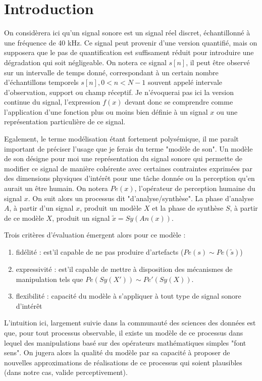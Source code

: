 \section{Introduction}

On considèrera ici qu'un signal sonore est un signal réel discret, échantillonné à une fréquence de 40 kHz. Ce signal peut provenir d'une version quantifié, mais on supposera que le pas de quantification est suffisament réduit pour introduire une dégradation qui soit négligeable. On notera ce signal $s[n]$, il peut être observé sur un intervalle de temps donné, correspondant à un certain nombre d'échantillons temporels $s[n], 0<n<N-1$ souvent appelé intervale d'observation, support ou champ réceptif. Je n'évoquerai pas ici la version continue du signal, l'expression $f(x)$ devant donc se comprendre comme l'application d'une fonction plus ou moins bien définie à un signal $x$ ou une représentation particulière de ce signal.

Egalement, le terme modélisation étant fortement polysémique, il me paraît important de préciser l'usage que je ferais du terme "modèle de son". Un modèle de son désigne pour moi une représentation du signal sonore qui permette de modifier ce signal de manière cohérente avec certaines contraintes exprimées par des dimensions physiques d'intérêt pour une tâche donnée ou la perception qu'en aurait un être humain. On notera $Pe(x)$, l'opérateur de perception humaine du signal $x$. On suit alors un processus dit "d'analyse/synthèse". La phase d'analyse $A$, à partir d'un signal $x$, produit un modèle $X$ et la phase de synthèse $S$, à partir de ce modèle $X$, produit un signal $\tilde{x}=Sy(An(x))$.

Trois critères d'évaluation émergent alors pour ce modèle :
\begin{enumerate}
  \item fidélité : est'il capable de ne pas produire d'artefacts ($Pe(s) \sim Pe(\tilde{s})$)
  \item expressivité : est'il capable de mettre à disposition des mécanismes de manipulation tels que $Pe(Sy(X')) \sim Pe'(Sy(X))$.
  \item flexibilité : capacité du modèle à s'appliquer à tout type de signal sonore d'intérêt
\end{enumerate}

L'intuition ici, largement suivie dans la communauté des sciences des données est que, pour tout processus observable, il existe un modèle de ce processus dans lequel des manipulations basé sur des opérateurs mathématiques simples "font sens". On jugera alors la qualité du modèle par sa capacité à proposer de nouvelles approximations de réalisations de ce processus qui soient plausibles (dans notre cas, valide perceptivement).

